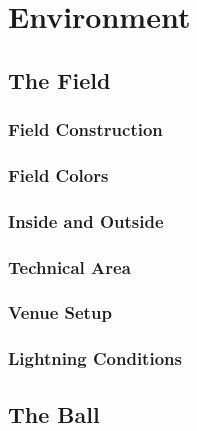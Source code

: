\section{Environment}
\label{sec:environment}

\subsection{The Field}
\label{sec:field}

\subsubsection{Field Construction}
\subsubsection{Field Colors}
\subsubsection{Inside and Outside}
\subsubsection{Technical Area}
\subsubsection{Venue Setup}
\subsubsection{Lightning Conditions}

\subsection{The Ball}
\label{sec:ball}
